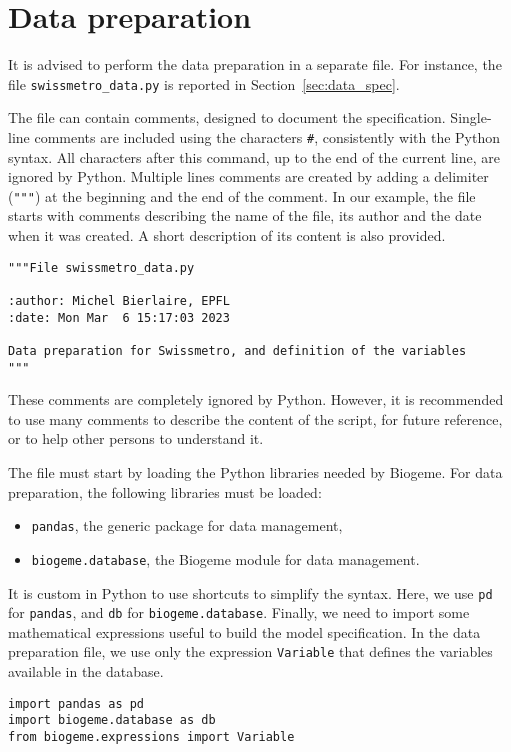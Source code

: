 \documentclass[12pt,a4paper]{article}
\begin{document}
\section{Data preparation}
\label{sec:data_prep}
It is advised to perform the data preparation in a separate file. For instance, the file \lstinline$swissmetro_data.py$ is reported in Section~\ref{sec:data_spec}.

The file can
contain comments, designed to document the specification.
Single-line comments are included using the characters \verb+#+, consistently with
the Python syntax. All characters
after this command, up to the end of the current line, are ignored by
Python.
Multiple lines comments  are created by adding a delimiter
(\verb+"""+) at the beginning and the end  of the comment.
In our example, the file starts with comments describing the name of
the file, its author and the date when it was created. A short
description of its content is also provided. 
\begin{lstlisting}[style=nonumbers]
"""File swissmetro_data.py

:author: Michel Bierlaire, EPFL
:date: Mon Mar  6 15:17:03 2023

Data preparation for Swissmetro, and definition of the variables
"""
\end{lstlisting}
These comments are
completely ignored by Python. However, it is recommended to use
many comments to describe the content of the script, for future
reference, or to help other persons to understand it. 

The  file must start by loading the Python libraries
needed by Biogeme. For data preparation, the following libraries must be loaded:
\begin{itemize}
\item \lstinline+pandas+, the generic package for data management,
\item \lstinline+biogeme.database+, the Biogeme module for data management.
\end{itemize}
It is custom in Python to use shortcuts to simplify the syntax. Here,
we use \lstinline+pd+ for  \lstinline+pandas+,  and \lstinline+db+ for \lstinline+biogeme.database+.   Finally, we need to import some mathematical expressions useful to build
the model specification. In the data preparation file, we use only the expression
\lstinline+Variable+ that defines the variables available in the database.
 
\begin{lstlisting}[style=nonumbers]
import pandas as pd
import biogeme.database as db
from biogeme.expressions import Variable
\end{lstlisting}
\end{document}
